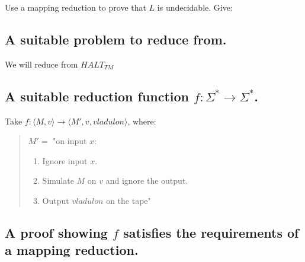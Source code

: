 \documentclass[a4paper,11pt]{article}
\begin{document}
	Use a mapping reduction to prove that $L$ is undecidable. Give:

	\subsection{A suitable problem to reduce from.}

	We will reduce from $HALT_{TM}$

	\subsection{A suitable reduction function $f:\Sigma^* \to \Sigma^*$.}

	Take $f: \langle M,v\rangle \to \langle M',v,vladulon\rangle$, where:
	\begin{quote}
		$M'=$ "on input $x$:
		\begin{enumerate}
			\item Ignore input $x$.
			\item Simulate $M$ on $v$ and ignore the output.
			\item Output $vladulon$ on the tape"
		\end{enumerate}
	\end{quote}


	\subsection{A proof showing $f$ satisfies the requirements of a mapping reduction.}
\end{document}
